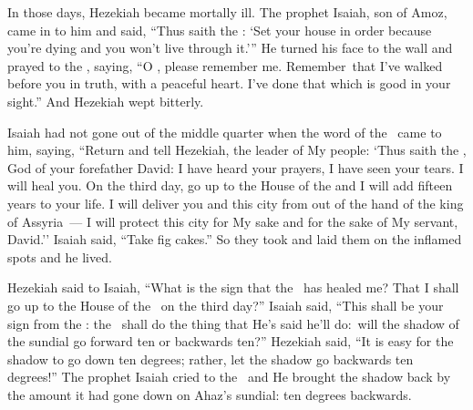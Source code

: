 
\begin{inparaenum}
   In those days, Hezekiah became mortally ill. The prophet Isaiah, son of Amoz, came in to him and said, ``Thus saith the \lord: `Set your house in order because you're dying and you won't live through it.'\thinspace''%
   He turned his face to the wall and prayed to the \lord, saying,%
   ``O \god, please remember me. Remember\understood\ that I've walked before you in truth, with a peaceful heart. I've done that which is good in your sight.'' And Hezekiah wept bitterly.%
  
   Isaiah had not gone out of the middle quarter when the word of the \lord\ came to him, saying,%
   ``Return and tell Hezekiah, the leader of My people: `Thus saith the \lord, God of your forefather David: I have heard your prayers, I have seen your tears. I will heal you. On the third day, go up to the House of the \lord%
   and I will add fifteen years to your life. I will deliver you and this city from out of the hand of the king of Assyria~--- I will protect this city for My sake and for the sake of My servant, David.''%
   Isaiah said, ``Take fig cakes.'' So they took and laid them on the inflamed spots and he lived.%
  
   Hezekiah said to Isaiah, ``What is the sign that the \lord\ has healed me? That I shall go up to the House of the \lord\ on the third day?''%
   Isaiah said, ``This shall be your sign from the \lord: the \lord\ shall do the thing that He's said he'll do:\understood\ will the shadow of the sundial go forward ten or backwards ten?''%
   Hezekiah said, ``It is easy for the shadow to go down ten degrees; rather, let the shadow go backwards ten degrees!''%
   The prophet Isaiah cried to the \lord\ and He brought the shadow back by the amount it had gone down on Ahaz's sundial: ten degrees backwards.%
  

\end{inparaenum}
